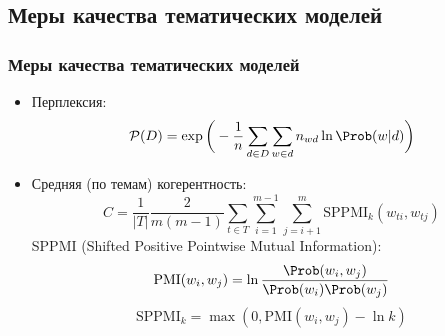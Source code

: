 \documentclass[unicode]{beamer}
\begin{document}
\subsection{Меры качества тематических моделей}
\begin{frame}
\frametitle{Меры качества тематических моделей}
\begin{itemize}
    \item Перплексия:
    $$\mathcal{P}(D) = \exp \bigg( -\frac{1}{n} \sum_{d \in D} \sum_{w \in d} n_{wd} \ln \Prob(w|d) \bigg)$$
    \item Средняя (по темам) когерентность:
    $$ C = \frac{1}{|T|} \frac{2}{m(m-1)} \sum_{t \in T} \sum_{i=1}^{m-1} \sum_{j=i+1}^m \text{SPPMI}_k (w_{ti}, w_{tj})$$
    SPPMI (Shifted Positive Pointwise Mutual Information):
    $$ \text{PMI} (w_i, w_j) = \ln \frac{\Prob(w_i, w_j)}{\Prob(w_i) \Prob(w_j)}$$
    $$\text{SPPMI}_k = \max(0, \text{PMI}(w_i, w_j) - \ln k)$$
\end{itemize}
\end{frame}
\end{document}
